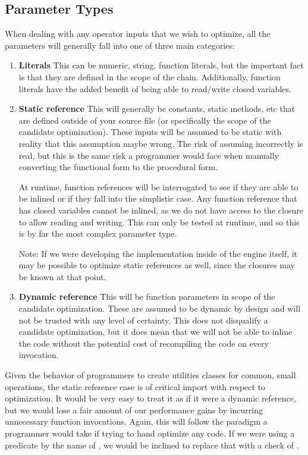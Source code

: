 \subsection{Parameter Types}
When dealing with any operator inputs that we wish to optimize, all the parameters will generally fall into one of three main categories:

\begin{enumerate}
  \item \textbf{Literals}
    This can be numeric, string, function literals, but the important fact is that they are defined in the scope of the chain.  Additionally, function literals have the added benefit of being able to read/write closed variables.

  \item \textbf{Static reference}
    This will generally be constants, static methods, etc that are defined outside of your source file (or specifically the scope of the candidate optimization).  These inputs will be assumed to be static with reality that this assumption maybe wrong.  The risk of assuming incorrectly is real, but this is the same risk a programmer would face when manually converting the functional form to the procedural form.  
    
    At runtime, function references will be interrogated to see if they are able to be inlined or if they fall into the simplistic case.  Any function reference that has closed variables cannot be inlined, as we do not have access to the closure to allow reading and writing.  This can only be tested at runtime, and so this is by far the most complex parameter type.  
    
    Note: If we were developing the implementation inside of the \javascript engine itself, it may be possible to optimize static references as well, since the closures may be known at that point.

  \item \textbf{Dynamic reference}
    This will be function parameters in scope of the candidate optimization. These are assumed to be dynamic by design and will not be trusted with any level of certainty.  This does not disqualify a candidate optimization, but it does mean that we will not be able to inline the code without the potential cost of recompiling the code on every invocation.
\end{enumerate}

Given the behavior of programmers to create utilities classes for common, small operations, the static reference case is of critical import with respect to optimization.  It would be very easy to treat it as if it were a dynamic reference, but we would lose a fair amount of our performance gains by incurring unnecessary function invocations.  Again, this will follow the paradigm a programmer would take if trying to hand optimize any code.  If we were using a predicate by the name of , we would be inclined to replace that with a check of . 
